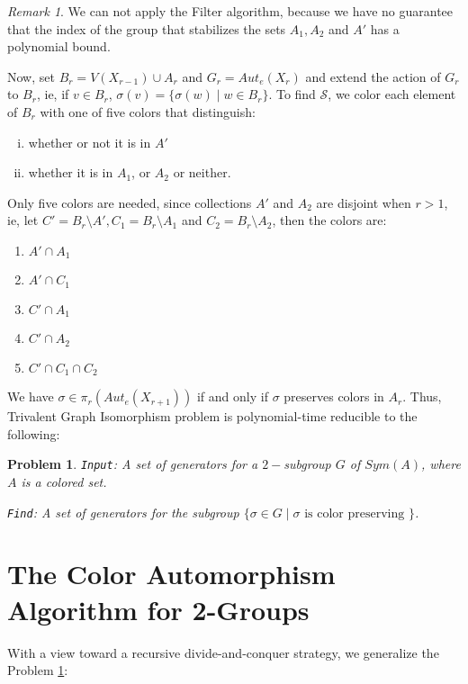 \documentclass[12pt,a4paper]{book}
\theoremstyle{plain}
\newtheorem{problem}{Problem}
\theoremstyle{definition}
\theoremstyle{remark}
\newtheorem{remark}{Remark}
\begin{document}
\begin{remark}
 We can not apply the {\sc Filter algorithm}, because we have no guarantee that the index 
  of the group that stabilizes the sets $A_1, A_2$ and $A'$ has a polynomial bound.
  \end{remark}


Now, set $B_r = V(X_{r-1}) \cup A_r$ and $G_r = Aut_e(X_r)$ and extend the action of $G_r$ to $B_r$, ie, if $v \in B_r$, $\sigma(v) = \{ \sigma(w) \; | \; w \in B_r \}$. 
To find $\mathcal{S}$, we color each element of $B_r$ with one of five colors that distinguish:
\begin{enumerate}[i)]
 \item whether or not it is in $A'$
 \item whether it is in $A_1$, or $A_2$ or neither.
\end{enumerate}
Only five colors are needed, since collections $A'$ and $A_2$ are disjoint when $r>1$, ie, let $C'  = B_r \setminus A', C_1 = B_r \setminus A_1$ 
and $C_2 = B_r \setminus A_2$, then the colors are:
\begin{enumerate}
 \item $A' \cap A_1 $ 
 \item $A' \cap C_1 $
 \item $C' \cap A_1 $
 \item $C' \cap A_2 $
 \item $C' \cap C_1 \cap C_2$
\end{enumerate}

We have $\sigma \in \pi_r ( Aut_e(X_{r+1}))$ if and only if $\sigma$ preserves colors in $A_r$. Thus, Trivalent Graph Isomorphism  problem is polynomial-time 
reducible to the following:

\begin{problem}\label{Problem3}
 \texttt{Input}: A set of generators for a $2-$subgroup $G$ of $Sym(A)$, where $A$ is a colored set. 

 \texttt{Find}: A set of generators for the subgroup $\{ \sigma \in G \; | \; \sigma \mbox{ is color preserving } \}$.
\end{problem}

\section{The Color Automorphism Algorithm for 2-Groups}

With a view toward a recursive divide-and-conquer strategy, we generalize the Problem \ref{Problem3}:
\end{document}
